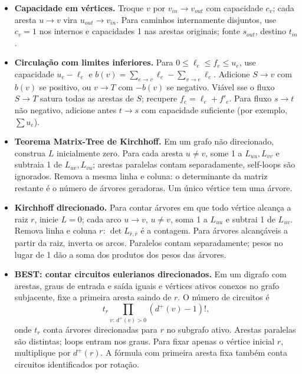 \begin{itemize}[leftmargin=*,label={}]
	\ifextended
	\item \textbf{Capacidade em vértices.}
		Troque $v$ por $v_{in}\to v_{out}$ com capacidade $c_v$; cada aresta $u\to v$ vira $u_{out}\to v_{in}$. Para caminhos internamente disjuntos, use $c_v=1$ nos internos e capacidades 1 nas arestas originais; fonte $s_{out}$, destino $t_{in}$.
	\fi

	\item \textbf{Circulação com limites inferiores.}
		Para $0\le\ell_e\le f_e\le u_e$, use capacidade $u_e-\ell_e$ e $b(v)=\sum_{e\to v}\ell_e-\sum_{v\to e}\ell_e$. Adicione $S\to v$ com $b(v)$ se positivo, ou $v\to T$ com $-b(v)$ se negativo. Viável sse o fluxo $S\to T$ satura todas as arestas de $S$; recupere $f_e=\ell_e+f'_e$.
		Para fluxo $s\to t$ não negativo, adicione antes $t\to s$ com capacidade suficiente (por exemplo, $\sum u_e$).

	\item \textbf{Teorema Matrix-Tree de Kirchhoff.}
Em um grafo não direcionado, construa $L$ inicialmente zero. Para cada aresta $u\ne v$, some 1 a $L_{uu},L_{vv}$ e subtraia 1 de $L_{uv},L_{vu}$; arestas paralelas contam separadamente, self-loops são ignorados. Remova a mesma linha e coluna: o determinante da matriz restante é o número de árvores geradoras. Um único vértice tem uma árvore.

\item \textbf{Kirchhoff direcionado.}
Para contar árvores em que todo vértice alcança a raiz $r$, inicie $L=0$; cada arco $u\to v$, $u\ne v$, soma 1 a $L_{uu}$ e subtrai 1 de $L_{uv}$. Remova linha e coluna $r$: $\det L_{\widehat r,\widehat r}$ é a contagem. Para árvores alcançáveis a partir da raiz, inverta os arcos. Paralelos contam separadamente; pesos no lugar de 1 dão a soma dos produtos dos pesos das árvores.

\item \textbf{BEST: contar circuitos eulerianos direcionados.}
Em um digrafo com arestas, graus de entrada e saída iguais e vértices ativos conexos no grafo subjacente, fixe a primeira aresta saindo de $r$. O número de circuitos é
\[
 t_r\prod_{v:\,d^+(v)>0}(d^+(v)-1)!,
\]
onde $t_r$ conta árvores direcionadas para $r$ no subgrafo ativo. Arestas paralelas são distintas; loops entram nos graus. Para fixar apenas o vértice inicial $r$, multiplique por $d^+(r)$. A fórmula com primeira aresta fixa também conta circuitos identificados por rotação.


\end{itemize}
